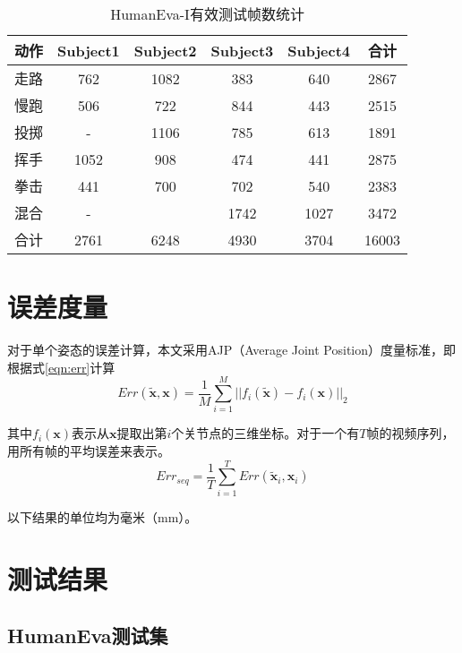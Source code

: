 \begin{table}[H]
  \centering
  \caption{HumanEva-I有效测试帧数统计}
  \label{tab:validframes}
    \begin{tabular}{lccccc}
      \toprule[1.5pt]
      动作 & Subject1 & Subject2 & Subject3 & Subject4 & 合计 \\\midrule[1pt]
      走路 & 762 & 1082 & 383 & 640 & 2867\\
      慢跑 & 506 & 722 & 844 & 443 & 2515\\
      投掷 & - & 1106 & 785 & 613 & 1891\\
      挥手 & 1052 & 908 & 474 & 441 & 2875\\
      拳击 & 441 & 700 & 702 & 540 & 2383\\
      混合 & -& & 1742 & 1027& 3472\\
      合计 &  2761& 6248 & 4930 & 3704& 16003\\
      \bottomrule[1.5pt]
    \end{tabular}
\end{table}

\section{误差度量}
对于单个姿态的误差计算，本文采用AJP（Average Joint Position）度量标准，即根据式\ref{eqn:err}计算
\begin{equation}
  Err(\widetilde{\mathbf{x}},\mathbf{x}) = \frac{1}{M}\sum^M_{i=1}||f_i(\widetilde{\mathbf{x}})-f_i(\mathbf{x})||_2  \label{eqn:err}
\end{equation}

其中$f_i(\mathbf{x})$表示从$\mathbf{x}$提取出第$i$个关节点的三维坐标。对于一个有$T$帧的视频序列，用所有帧的平均误差来表示。
\begin{equation}
  Err_{seq} = \frac{1}{T}\sum^T_{i=1}Err(\widetilde{\mathbf{x}}_i,\mathbf{x}_i)
\end{equation}

以下结果的单位均为毫米（mm）。

\section{测试结果}
\subsection{HumanEva测试集}

